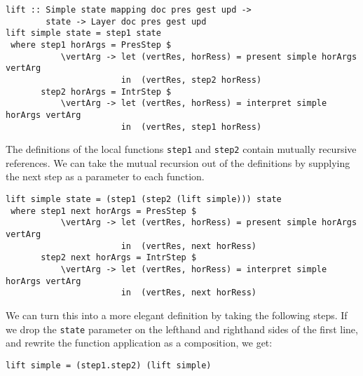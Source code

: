 \begin{small}
\begin{verbatim}
lift :: Simple state mapping doc pres gest upd ->
        state -> Layer doc pres gest upd
lift simple state = step1 state 
 where step1 horArgs = PresStep $ 
           \vertArg -> let (vertRes, horRess) = present simple horArgs vertArg                                         
                       in  (vertRes, step2 horRess)
       step2 horArgs = IntrStep $
           \vertArg -> let (vertRes, horRess) = interpret simple horArgs vertArg                     
                       in  (vertRes, step1 horRess)
\end{verbatim}
\end{small}

The definitions of the local functions \texttt{step1} and \texttt{step2} contain mutually recursive references. We can take the mutual recursion out of the definitions by supplying the next step as a parameter to each function.  

      
\begin{small}
\begin{verbatim}
lift simple state = (step1 (step2 (lift simple))) state 
 where step1 next horArgs = PresStep $ 
           \vertArg -> let (vertRes, horRess) = present simple horArgs vertArg                                         
                       in  (vertRes, next horRess)
       step2 next horArgs = IntrStep $
           \vertArg -> let (vertRes, horRess) = interpret simple horArgs vertArg                     
                       in  (vertRes, next horRess)
\end{verbatim}
\end{small}

We can turn this into a more elegant definition by taking the following steps. If we drop the \texttt{state} parameter  on the lefthand and righthand sides of the first line, and rewrite the function application as a composition, we get:

\begin{small}
\begin{verbatim}
lift simple = (step1.step2) (lift simple)
\end{verbatim}
\end{small}

